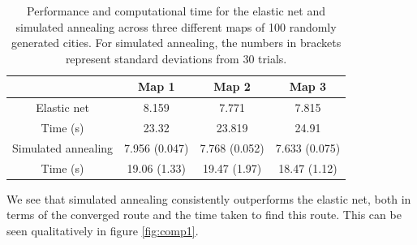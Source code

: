 \documentclass{article}
\begin{document}
\begin{table}[h]
\centering
\begin{tabular}{ |c|c|c|c|}
\hline
 &Map 1 &Map 2 & Map 3 \\
\hline
Elastic net & 8.159 & 7.771 & 7.815 \\
Time (s) & 23.32 & 23.819& 24.91 \\
\hline
Simulated annealing & 7.956 (0.047) & 7.768 (0.052)& 7.633 (0.075)\\
Time (s) & 19.06 (1.33) & 19.47 (1.97) & 18.47 (1.12)\\
\hline
\end{tabular}
\caption{Performance and computational time for the elastic net and simulated annealing across three different maps of 100 randomly generated cities. For simulated annealing, the numbers in brackets represent standard deviations from 30 trials.}
\label{tab:tsp}
\end{table}

We see that simulated annealing consistently outperforms the elastic net, both in terms of the converged route and the time taken to find this route. This can be seen qualitatively in figure \ref{fig:comp1}.
\end{document}
